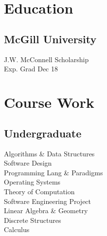 \documentclass[]{allanwang-resume}
\begin{document}
 
\header

\hspace*{-\parindent}%
\begin{minipage}[t][][b]{0.33\textwidth}~

	~\\


	\section{Education}
	\subsection{McGill University}
	J.W. McConnell Scholarship \\
	Exp. Grad Dec 18
	\sectionsep

	\section{Course Work}
	\subsection{Undergraduate}
	Algorithms \& Data Structures \\
	Software Design \\
	Programming Lang \& Paradigms \\
	Operating Systems \\
	Theory of Computation \\
	Software Engineering Project \\
	Linear Algebra \& Geometry \\
	Discrete Structures \\
	Calculus \\
	\sectionsep


\end{minipage}
\end{document}
